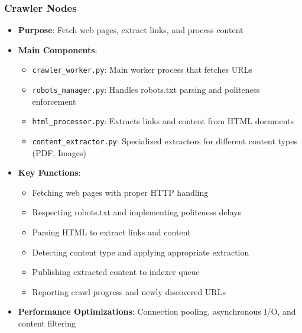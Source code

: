 \documentclass[12pt,a4paper]{report}
\begin{document}
\subsubsection{Crawler Nodes}
\begin{itemize}
    \item \textbf{Purpose}: Fetch web pages, extract links, and process content
    \item \textbf{Main Components}:
    \begin{itemize}
        \item \texttt{crawler\_worker.py}: Main worker process that fetches URLs
        \item \texttt{robots\_manager.py}: Handles robots.txt parsing and politeness enforcement
        \item \texttt{html\_processor.py}: Extracts links and content from HTML documents
        \item \texttt{content\_extractor.py}: Specialized extractors for different content types (PDF, Images)
    \end{itemize}
    \item \textbf{Key Functions}:
    \begin{itemize}
        \item Fetching web pages with proper HTTP handling
        \item Respecting robots.txt and implementing politeness delays
        \item Parsing HTML to extract links and content
        \item Detecting content type and applying appropriate extraction
        \item Publishing extracted content to indexer queue
        \item Reporting crawl progress and newly discovered URLs
    \end{itemize}
    \item \textbf{Performance Optimizations}: Connection pooling, asynchronous I/O, and content filtering
\end{itemize}
\end{document}

